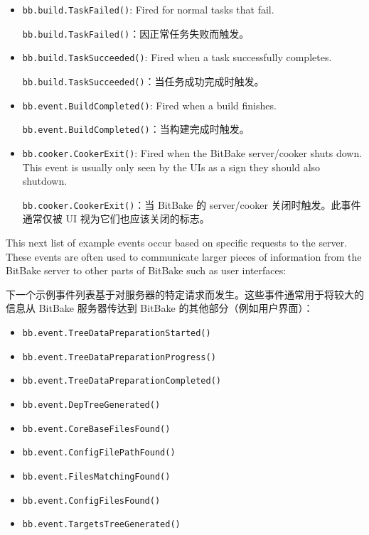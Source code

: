\begin{itemize}
\item \texttt{bb.build.TaskFailed()}: Fired for normal tasks that fail.

\medskip
\texttt{bb.build.TaskFailed()}：因正常任务失败而触发。

\item \texttt{bb.build.TaskSucceeded()}: Fired when a task successfully completes.

\medskip
\texttt{bb.build.TaskSucceeded()}：当任务成功完成时触发。

\item \texttt{bb.event.BuildCompleted()}: Fired when a build finishes.

\medskip
\texttt{bb.event.BuildCompleted()}：当构建完成时触发。

\item \texttt{bb.cooker.CookerExit()}: Fired when the BitBake server/cooker shuts down. This event is usually only seen by the UIs as a sign they should also shutdown.

\medskip
\texttt{bb.cooker.CookerExit()}：当 BitBake 的 server/cooker 关闭时触发。此事件通常仅被 UI 视为它们也应该关闭的标志。

\end{itemize}

This next list of example events occur based on specific requests to the server. These events are often used to communicate larger pieces of information from the BitBake server to other parts of BitBake such as user interfaces:

下一个示例事件列表基于对服务器的特定请求而发生。这些事件通常用于将较大的信息从 BitBake 服务器传达到 BitBake 的其他部分（例如用户界面）：

\begin{itemize}
\setlength\itemsep{1.0em}
\item \texttt{bb.event.TreeDataPreparationStarted()}

\item \texttt{bb.event.TreeDataPreparationProgress()}

\item \texttt{bb.event.TreeDataPreparationCompleted()}

\item \texttt{bb.event.DepTreeGenerated()}

\item \texttt{bb.event.CoreBaseFilesFound()}

\item \texttt{bb.event.ConfigFilePathFound()}

\item \texttt{bb.event.FilesMatchingFound()}

\item \texttt{bb.event.ConfigFilesFound()}

\item \texttt{bb.event.TargetsTreeGenerated()}
\end{itemize}

